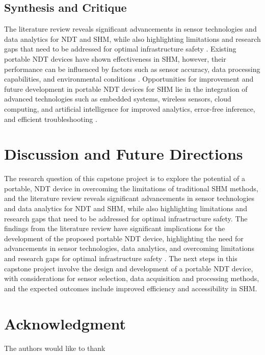 \documentclass[journal, a4paper]{IEEEtran}
\begin{document}
\subsection{Synthesis and Critique}
The literature review reveals significant advancements in sensor technologies and data analytics
for NDT and SHM,
while also highlighting limitations and research gaps that need to be addressed for optimal infrastructure safety \cite{Vijayan2023} \cite{Hassani2023}.
Existing portable NDT devices have shown effectiveness in SHM,
however, their performance can be influenced by factors such as sensor accuracy, data processing capabilities,
and environmental conditions \cite{Vijayan2023} \cite{Hassani2023}.
Opportunities for improvement and future development in portable NDT devices
for SHM lie in the integration of advanced technologies such as embedded systems,
wireless sensors, cloud computing, and artificial intelligence for improved analytics, error-free inference,
and efficient troubleshooting \cite{Meier2018}.


\section{Discussion and Future Directions}  %
The research question of this capstone project is to explore the potential of a portable,
NDT device in overcoming the limitations of traditional SHM methods,
and the literature review reveals significant advancements in sensor technologies and data analytics for NDT and SHM,
while also highlighting limitations and research gaps that need to be addressed for optimal infrastructure safety.
The findings from the literature review have significant implications for the development of the
proposed portable NDT device, highlighting the need for advancements in sensor technologies,
data analytics, and overcoming limitations and research gaps for optimal infrastructure safety \cite{Udell2018} \cite{Meier2018}.
The next steps in this capstone project involve the design and development of a portable
NDT device, with considerations for sensor selection, data acquisition and processing methods,
and the expected outcomes include improved efficiency and accessibility in SHM.





\section*{Acknowledgment}
The authors would like to thank \lipsum[1]



\ifCLASSOPTIONcaptionsoff
  \newpage
\fi






\end{document}
